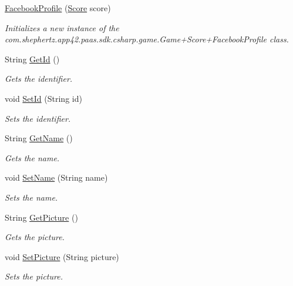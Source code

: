 \begin{DoxyCompactItemize}
\item 
\hyperlink{classcom_1_1shephertz_1_1app42_1_1paas_1_1sdk_1_1csharp_1_1game_1_1_game_1_1_score_1_1_facebook_profile_ac205207eae3a2b50db0fa8e514e885b2}{Facebook\+Profile} (\hyperlink{classcom_1_1shephertz_1_1app42_1_1paas_1_1sdk_1_1csharp_1_1game_1_1_game_1_1_score}{Score} score)
\begin{DoxyCompactList}\small\item\em Initializes a new instance of the com.\+shephertz.\+app42.\+paas.\+sdk.\+csharp.\+game.\+Game+\+Score+\+Facebook\+Profile class. \end{DoxyCompactList}\item 
String \hyperlink{classcom_1_1shephertz_1_1app42_1_1paas_1_1sdk_1_1csharp_1_1game_1_1_game_1_1_score_1_1_facebook_profile_abb79952278bde701f1d1a1ce6a344903}{Get\+Id} ()
\begin{DoxyCompactList}\small\item\em Gets the identifier. \end{DoxyCompactList}\item 
void \hyperlink{classcom_1_1shephertz_1_1app42_1_1paas_1_1sdk_1_1csharp_1_1game_1_1_game_1_1_score_1_1_facebook_profile_aa4d047418d0f117bf1b0d6424a64399d}{Set\+Id} (String id)
\begin{DoxyCompactList}\small\item\em Sets the identifier. \end{DoxyCompactList}\item 
String \hyperlink{classcom_1_1shephertz_1_1app42_1_1paas_1_1sdk_1_1csharp_1_1game_1_1_game_1_1_score_1_1_facebook_profile_afbac9b6a16f5b76c9fff565e7aac8147}{Get\+Name} ()
\begin{DoxyCompactList}\small\item\em Gets the name. \end{DoxyCompactList}\item 
void \hyperlink{classcom_1_1shephertz_1_1app42_1_1paas_1_1sdk_1_1csharp_1_1game_1_1_game_1_1_score_1_1_facebook_profile_a2a501c3a0cb537e8895041470b80d2b3}{Set\+Name} (String name)
\begin{DoxyCompactList}\small\item\em Sets the name. \end{DoxyCompactList}\item 
String \hyperlink{classcom_1_1shephertz_1_1app42_1_1paas_1_1sdk_1_1csharp_1_1game_1_1_game_1_1_score_1_1_facebook_profile_aea57fe4fba87e40663b4f760f2646c04}{Get\+Picture} ()
\begin{DoxyCompactList}\small\item\em Gets the picture. \end{DoxyCompactList}\item 
void \hyperlink{classcom_1_1shephertz_1_1app42_1_1paas_1_1sdk_1_1csharp_1_1game_1_1_game_1_1_score_1_1_facebook_profile_ab699006722cfd533f48bb53b6161243f}{Set\+Picture} (String picture)
\begin{DoxyCompactList}\small\item\em Sets the picture. \end{DoxyCompactList}\end{DoxyCompactItemize}
